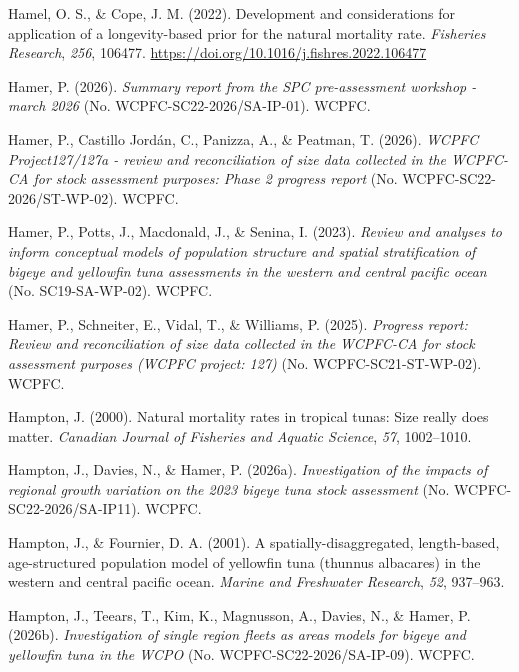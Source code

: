 \documentclass[
  english,
  a4paper,
  a4paper,
  11pt]{SCreport}
\newlength{\cslhangindent}
\newenvironment{CSLReferences}[2] %
 {\begin{list}{}{%
  \setlength{\itemindent}{0pt}
  \setlength{\leftmargin}{0pt}
  \setlength{\parsep}{0pt}
  \ifodd #1
   \setlength{\leftmargin}{\cslhangindent}
   \setlength{\itemindent}{-1\cslhangindent}
  \fi
  \setlength{\itemsep}{#2\baselineskip}}}
 {\end{list}}
\begin{document}
\begin{CSLReferences}{1}{0}
Hamel, O. S., \& Cope, J. M. (2022). Development and considerations for
application of a longevity-based prior for the natural mortality rate.
\emph{Fisheries Research}, \emph{256}, 106477.
\url{https://doi.org/10.1016/j.fishres.2022.106477}

Hamer, P. (2026). \emph{Summary report from the {SPC} pre-assessment
workshop - march 2026} (No. {WCPFC}-{SC}22-2026/{SA}-{IP}-01). WCPFC.

Hamer, P., Castillo Jordán, C., Panizza, A., \& Peatman, T. (2026).
\emph{{WCPFC} Project127/127a - review and reconciliation of size data
collected in the {WCPFC}-{CA} for stock assessment purposes: Phase 2
progress report} (No. {WCPFC}-{SC}22-2026/{ST}-{WP}-02). WCPFC.

Hamer, P., Potts, J., Macdonald, J., \& Senina, I. (2023). \emph{Review
and analyses to inform conceptual models of population structure and
spatial stratification of bigeye and yellowfin tuna assessments in the
western and central pacific ocean} (No. {SC}19-{SA}-{WP}-02). WCPFC.

Hamer, P., Schneiter, E., Vidal, T., \& Williams, P. (2025).
\emph{Progress report: Review and reconciliation of size data collected
in the {WCPFC}-{CA} for stock assessment purposes ({WCPFC} project:
127)} (No. {WCPFC}-{SC}21-{ST}-{WP}-02). WCPFC.

Hampton, J. (2000). Natural mortality rates in tropical tunas: Size
really does matter. \emph{Canadian Journal of Fisheries and Aquatic
Science}, \emph{57}, 1002--1010.

Hampton, J., Davies, N., \& Hamer, P. (2026a). \emph{Investigation of
the impacts of regional growth variation on the 2023 bigeye tuna stock
assessment} (No. {WCPFC}-{SC}22-2026/{SA}-{IP}11). WCPFC.

Hampton, J., \& Fournier, D. A. (2001). A spatially-disaggregated,
length-based, age-structured population model of yellowfin tuna (thunnus
albacares) in the western and central pacific ocean. \emph{Marine and
Freshwater Research}, \emph{52}, 937--963.

Hampton, J., Teears, T., Kim, K., Magnusson, A., Davies, N., \& Hamer,
P. (2026b). \emph{Investigation of single region fleets as areas models
for bigeye and yellowfin tuna in the {WCPO}} (No.
{WCPFC}-{SC}22-2026/{SA}-{IP}-09). WCPFC.


\end{CSLReferences}
\end{document}
